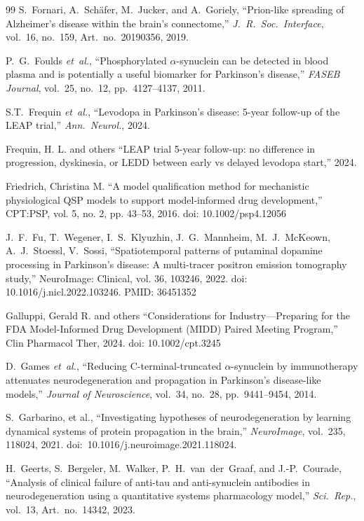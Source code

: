 \begin{thebibliography}{99}
S.~Fornari, A.~Sch{\"a}fer, M.~Jucker, and A.~Goriely, ``Prion-like spreading of Alzheimer's disease within the brain's connectome,'' \textit{J.\ R.\ Soc.\ Interface}, vol.~16, no.~159, Art.\ no.~20190356, 2019.


P.~G.~Foulds \textit{et~al.}, ``Phosphorylated $\alpha$-synuclein can be detected in blood plasma and is potentially a useful biomarker for Parkinson's disease,'' \textit{FASEB Journal}, vol.~25, no.~12, pp.~4127--4137, 2011.

S.T.~Frequin \textit{et~al.}, ``Levodopa in Parkinson's disease: 5-year
follow-up of the LEAP trial,'' \textit{Ann.\ Neurol.}, 2024.

 Frequin, H. L. and others ``LEAP trial 5-year follow-up: no difference in progression, dyskinesia, or LEDD between early vs delayed levodopa start,'' 2024.

 Friedrich, Christina M. ``A model qualification method for mechanistic physiological QSP models to support model-informed drug development,'' CPT:PSP, vol. 5, no. 2, pp. 43--53, 2016. doi: 10.1002/psp4.12056

 J.~F.~Fu, T.~Wegener, I.~S.~Klyuzhin, J.~G.~Mannheim, M.~J.~McKeown, A.~J.~Stoessl, V.~Sossi, ``Spatiotemporal patterns of putaminal dopamine processing in Parkinson's disease: A multi-tracer positron emission tomography study,'' NeuroImage: Clinical, vol. 36, 103246, 2022. doi: 10.1016/j.nicl.2022.103246. PMID: 36451352

 Galluppi, Gerald R. and others ``Considerations for Industry---Preparing for the FDA Model-Informed Drug Development (MIDD) Paired Meeting Program,'' Clin Pharmacol Ther, 2024. doi: 10.1002/cpt.3245

D.~Games \textit{et~al.}, ``Reducing C-terminal-truncated $\alpha$-synuclein by immunotherapy attenuates neurodegeneration and propagation in Parkinson's disease-like models,'' \textit{Journal of Neuroscience}, vol.~34, no.~28, pp.~9441--9454, 2014.

S.~Garbarino, et al., ``Investigating hypotheses of neurodegeneration by learning dynamical systems of protein propagation in the brain,'' \textit{NeuroImage}, vol.~235, 118024, 2021. doi:~10.1016/j.neuroimage.2021.118024.

H.~Geerts, S.~Bergeler, M.~Walker, P.~H.~van~der~Graaf, and J.-P.~Courade, ``Analysis of clinical failure of anti-tau and anti-synuclein antibodies in neurodegeneration using a quantitative systems pharmacology model,'' \textit{Sci.\ Rep.}, vol.~13, Art.\ no.~14342, 2023.


\end{thebibliography}
